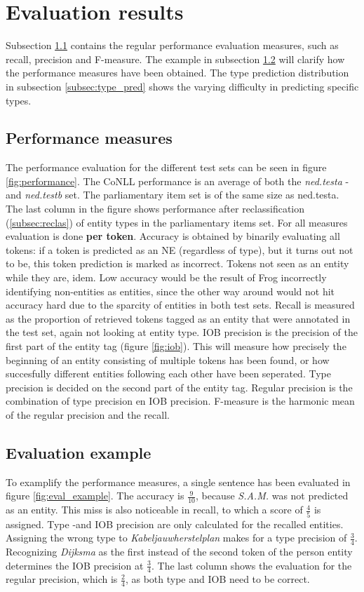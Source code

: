 \section{Evaluation results}
Subsection \ref{subsec:per_mes} contains the regular performance evaluation measures, such as recall, precision and F-measure. The example in subsection \ref{subsec:eval_example} will clarify how the performance measures have been obtained. The type prediction distribution in subsection \ref{subsec:type_pred} shows the varying difficulty in predicting specific types.

\label{sec:eva}
\subsection{Performance measures}\label{subsec:per_mes}
The performance evaluation for the different test sets can be seen in figure \ref{fig:performance}. The CoNLL performance is an average of both the \textit{ned.testa} -and \textit{ned.testb} set. The parliamentary item set is of the same size as ned.testa. The last column in the figure shows performance after reclassification (\ref{subsec:reclas}) of entity types in the parliamentary items set. For all measures evaluation is done \textbf{per token}. Accuracy is obtained by binarily evaluating all tokens: if a token is predicted as an NE (regardless of type), but it turns out not to be, this token prediction is marked as incorrect. Tokens not seen as an entity while they are, idem. Low accuracy would be the result of Frog incorrectly identifying non-entities as entities, since the other way around would not hit accuracy hard due to the sparcity of entities in both test sets. Recall is measured as the proportion of retrieved tokens tagged as an entity that were annotated in the test set, again not looking at entity type. IOB precision is the precision of the first part of the entity tag (figure \ref{fig:iob}). This will measure how precisely the beginning of an entity consisting of multiple tokens has been found, or how succesfully different entities following each other have been seperated. Type precision is decided on the second part of the entity tag.  Regular precision is the combination of type precision en IOB precision. F-measure is the harmonic mean of the regular precision and the recall.

\subsection{Evaluation example}\label{subsec:eval_example}
To examplify the performance measures, a single sentence has been evaluated in figure \ref{fig:eval_example}. The accuracy is $\frac{9}{10}$, because \textit{S.A.M.} was not predicted as an entity. This miss is also noticeable in recall, to which a score of $\frac{4}{5}$ is assigned. Type -and IOB precision are only calculated for the recalled entities. Assigning the wrong type to \textit{Kabeljauwherstelplan} makes for a type precision of $\frac{3}{4}$. Recognizing \textit{Dijksma} as the first instead of the second token of the person entity determines the IOB precision at $\frac{3}{4}$. The last column shows the evaluation for the regular precision, which is $\frac{2}{4}$, as both type and IOB need to be correct.

